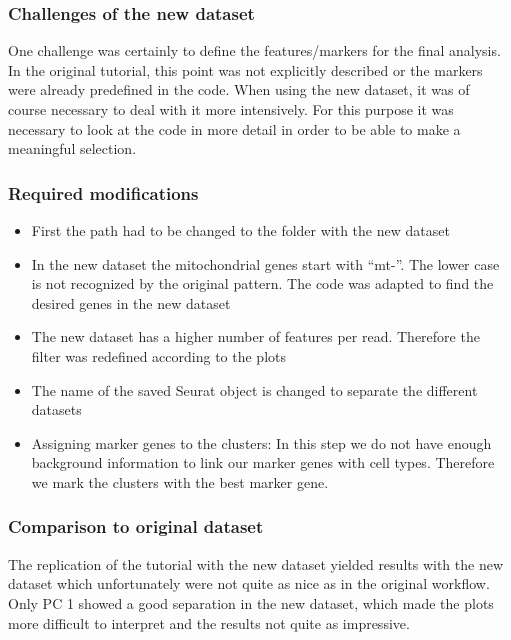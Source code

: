 \hypertarget{challenges-of-the-new-dataset}{%
\subsubsection{Challenges of the new
dataset}\label{challenges-of-the-new-dataset}}

One challenge was certainly to define the features/markers for the final
analysis. In the original tutorial, this point was not explicitly
described or the markers were already predefined in the code. When using
the new dataset, it was of course necessary to deal with it more
intensively. For this purpose it was necessary to look at the code in
more detail in order to be able to make a meaningful selection.

\hypertarget{required-modifications}{%
\subsubsection{Required modifications}\label{required-modifications}}

\begin{itemize}
\tightlist
\item
  First the path had to be changed to the folder with the new dataset
\item
  In the new dataset the mitochondrial genes start with ``mt-''. The
  lower case is not recognized by the original pattern. The code was
  adapted to find the desired genes in the new dataset
\item
  The new dataset has a higher number of features per read. Therefore
  the filter was redefined according to the plots
\item
  The name of the saved Seurat object is changed to separate the
  different datasets
\item
  Assigning marker genes to the clusters: In this step we do not have
  enough background information to link our marker genes with cell
  types. Therefore we mark the clusters with the best marker gene.
\end{itemize}

\hypertarget{comparison-to-original-dataset}{%
\subsubsection{Comparison to original
dataset}\label{comparison-to-original-dataset}}

The replication of the tutorial with the new dataset yielded results
with the new dataset which unfortunately were not quite as nice as in
the original workflow. Only PC 1 showed a good separation in the new
dataset, which made the plots more difficult to interpret and the
results not quite as impressive.

